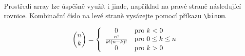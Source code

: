 \documentclass[hidelinks, twocolumn, a4paper, 11pt]{article}
\theoremstyle{definition}
\begin{document}
Prostředí array lze úspěšně využít i jinde, například na pravé straně následující rovnice. 
Kombinační číslo na levé straně vysázejte pomocí příkazu \verb|\binom|.

\[
    \begin{pmatrix}
        n \\
        k
    \end{pmatrix}
    =
    \left\{
    \begin{array}{c l}
        0 & \text{pro } k<0 \\
        \frac{n!}{k!(n-k)!} & \text{pro } 0 \leq k \leq n \\
        0 & \text{pro } k>0
    \end{array} \right.
\]
\end{document}
